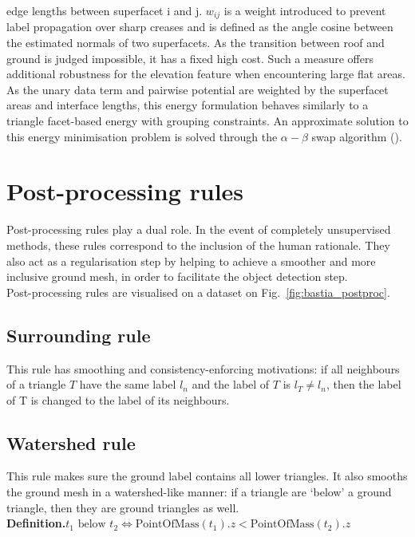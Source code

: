 \documentclass{kththesis}
\begin{document}
edge lengths between superfacet i and j.   $w_{ij}$ is a weight introduced to prevent label propagation over sharp creases and is defined as
the angle cosine between the estimated normals of two superfacets. As the transition between roof and ground is judged impossible, it has a fixed high cost. Such a measure offers additional robustness for the elevation feature when encountering large flat areas. \\
As the unary data term and pairwise potential are weighted by the
superfacet areas and interface lengths, this energy formulation behaves
similarly to a triangle facet-based energy with grouping constraints.
An approximate solution to this energy minimisation problem
is solved through the $\alpha-\beta$ swap algorithm (\textcite{BoykovEnergyMinim}). 


\section{Post-processing rules}
\label{sec:postproc}
Post-processing rules play a dual role. In the event of completely unsupervised methods, these rules correspond to the inclusion of the human rationale. They also act as a regularisation step by helping to achieve a smoother and more inclusive ground mesh, in order to facilitate the object detection step. \\
Post-processing rules are visualised on a dataset on Fig.~\ref{fig:bastia_postproc}. 
\subsection{Surrounding rule}
This rule has smoothing and consistency-enforcing motivations: if all neighbours of a triangle $T$ have the same label $l_n$ and the label of $T$ is $l_T \neq l_n$, then the label of T is changed to the label of its neighbours. 
\subsection{Watershed rule}
This rule makes sure the ground label contains all lower triangles. It also smooths the ground mesh in a watershed-like manner: if a triangle are ‘below’ a ground triangle, then they are ground triangles as well. \\
\textbf{Definition.}$t_1 \text{ below } t_2 \iff \text{PointOfMass}(t_1).z < \text{PointOfMass}(t_2).z$
\end{document}
